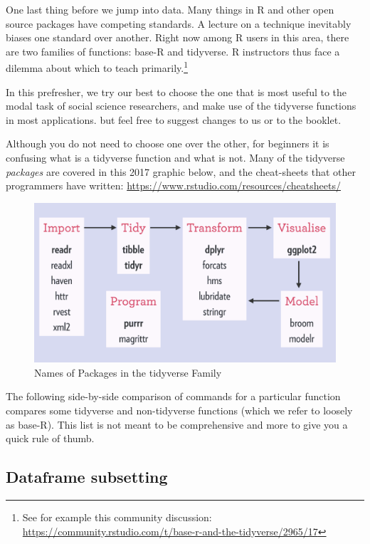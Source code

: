 \documentclass[]{book}
\let\rmarkdownfootnote\footnote%
\def\footnote{\protect\rmarkdownfootnote}
\theoremstyle{definition}
\theoremstyle{definition}
\theoremstyle{definition}
\theoremstyle{remark}
\begin{document}
One last thing before we jump into data. Many things in R and other open source packages have competing standards. A lecture on a technique inevitably biases one standard over another. Right now among R users in this area, there are two families of functions: base-R and tidyverse. R instructors thus face a dilemma about which to teach primarily.\footnote{See for example this community discussion: \url{https://community.rstudio.com/t/base-r-and-the-tidyverse/2965/17}}

In this prefresher, we try our best to choose the one that is most useful to the modal task of social science researchers, and make use of the tidyverse functions in most applications. but feel free to suggest changes to us or to the booklet.

Although you do not need to choose one over the other, for beginners it is confusing what is a tidyverse function and what is not. Many of the tidyverse \emph{packages} are covered in this 2017 graphic below, and the cheat-sheets that other programmers have written: \url{https://www.rstudio.com/resources/cheatsheets/}

\begin{figure}
\centering
\includegraphics{images/tidyverse-packages.png}
\caption{Names of Packages in the tidyverse Family}
\end{figure}

The following side-by-side comparison of commands for a particular function compares some tidyverse and non-tidyverse functions (which we refer to loosely as base-R). This list is not meant to be comprehensive and more to give you a quick rule of thumb.

\hypertarget{dataframe-subsetting}{%
\subsection*{Dataframe subsetting}\label{dataframe-subsetting}}
\end{document}

